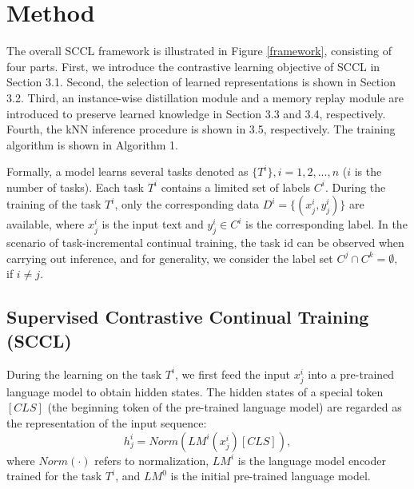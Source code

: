 \section{Method}
 The overall SCCL framework is illustrated in Figure \ref{framework}, consisting of four parts. First, we introduce the contrastive learning objective of SCCL in Section 3.1. Second, the selection of learned representations is shown in Section 3.2. Third, an instance-wise distillation module and a  memory replay module are introduced to preserve learned knowledge in Section 3.3 and 3.4, respectively. Fourth, the kNN inference procedure  is shown in  3.5, respectively. The training algorithm is shown in Algorithm 1. 

Formally, a model learns several tasks denoted as $\{T^i\}, i = 1,2,...,n$ ($i$ is the number of tasks).  Each task $T^i$ contains a limited set of labels $C^i$.  During the training of the task $T^i$, only the corresponding data $D^i = \{(x^i_j,y^i_j)\}$ are available, where $x^i_j$ is the input text and $y^i_j \in C^i$ is the corresponding label. In the scenario of task-incremental continual training, the task id can be observed when carrying out inference, and for generality, we consider the label set $C^j\cap  C^k = \emptyset, $ if $i\neq j$. 


\subsection{Supervised Contrastive Continual Training (SCCL)}
During the learning on the task $T^i$, we first feed the input $x^i_j$ into a pre-trained language model to obtain hidden states.  The hidden states of a special token $[CLS]$ (the beginning token of the pre-trained language model) are regarded as the representation of the input sequence:
\begin{equation}
    {h}^i_j = Norm(LM^{i}(x^i_j)[CLS]),
\end{equation}
where $Norm(\cdot)$ refers to normalization, $LM^{i}$ is the language model encoder trained for the task $T^{i}$, and $LM^0$ is the initial pre-trained language model. 



